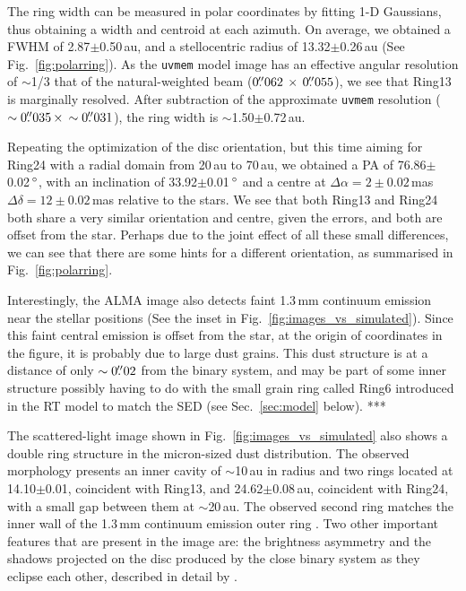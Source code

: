 \documentclass[letters,usenatbib,times]{mnras}
\begin{document}
The ring width can be measured in polar coordinates by fitting 1-D Gaussians, thus obtaining a width and centroid at each azimuth. On average, we obtained a FWHM of 2.87$\pm$0.50\,au, and a stellocentric radius of 13.32$\pm$0.26\,au (See Fig.~\ref{fig:polarring}). As the {\tt uvmem} model image has an effective angular resolution of $\sim$1/3 that of the natural-weighted beam ($0\hbox{$.\!\!^{\prime\prime}$}062 \,\times \, 0\hbox{$.\!\!^{\prime\prime}$}055$), we see that Ring13 is marginally resolved. After subtraction of the approximate {\tt uvmem} resolution ($\sim0\hbox{$.\!\!^{\prime\prime}$}035 \, \times \, \sim0\hbox{$.\!\!^{\prime\prime}$}031$), the ring width is $\sim$1.50$\pm$0.72\,au. 

Repeating the optimization of the disc orientation, but this time aiming for Ring24 with a radial domain from 20\,au to 70\,au, we obtained a PA of 76.86$\pm$0.02\,$\hbox{$^\circ$}$, with an inclination of 33.92$\pm$0.01\,$\hbox{$^\circ$}$ and a centre at $\Delta \alpha = 2\pm0.02$\,mas $\Delta \delta = 12\pm0.02$\,mas relative to the stars. We see that both Ring13 and Ring24 both share a very similar orientation and centre, given the errors, and both are offset from the star. %
Perhaps due to the joint effect of all these small differences, we can see that there are some hints for a different orientation, as summarised in Fig.~\ref{fig:polarring}.

Interestingly, the ALMA image also detects faint 1.3\,mm continuum emission near the stellar positions (See the inset in Fig.~\ref{fig:images_vs_simulated}). Since this faint central emission is offset from the star, at the origin of coordinates in the figure, it is probably due to large dust grains. This dust structure is at a distance of only $\sim0\hbox{$.\!\!^{\prime\prime}$}02$ from the binary system, and may be part of some inner structure possibly having to do with the small grain ring called Ring6 introduced in the RT model to match the SED (see Sec.~\ref{sec:model} below). ***

The scattered-light image shown in Fig.~\ref{fig:images_vs_simulated} also shows a double ring structure in the micron-sized dust distribution. The observed morphology presents an inner cavity of $\sim$10\,au in radius and two rings located at 14.10$\pm$0.01, coincident with Ring13, and 24.62$\pm$0.08\,au, coincident with Ring24, with a small gap between them at $\sim$20\,au. The observed second ring matches the inner wall of the 1.3\,mm continuum emission outer ring \citep{Ru_z_Rodr_guez_2019}. Two other important features that are present in the image are: the brightness asymmetry and the shadows projected on the disc produced by the close binary system as they eclipse each other, described in detail by \citet{dOrazi}.
\end{document}
